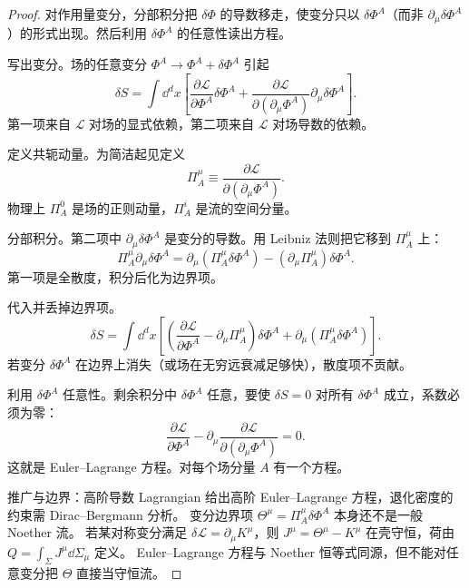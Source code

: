 \begin{proof}
对作用量变分，分部积分把 $\delta\Phi$ 的导数移走，使变分只以 $\delta\Phi^A$（而非 $\partial_\mu\delta\Phi^A$）的形式出现。然后利用 $\delta\Phi^A$ 的任意性读出方程。

写出变分。场的任意变分 $\Phi^A\to\Phi^A+\delta\Phi^A$ 引起
\begin{equation*}
\delta S=\int \dd^dx\left[\frac{\partial\mathcal{L}}{\partial\Phi^A}\delta\Phi^A+\frac{\partial\mathcal{L}}{\partial(\partial_\mu\Phi^A)}\partial_\mu\delta\Phi^A\right].
\end{equation*}
第一项来自 $\mathcal{L}$ 对场的显式依赖，第二项来自 $\mathcal{L}$ 对场导数的依赖。

定义共轭动量。为简洁起见定义
\begin{equation*}
\Pi_A^\mu\equiv\frac{\partial\mathcal{L}}{\partial(\partial_\mu\Phi^A)}.
\end{equation*}
物理上 $\Pi_A^0$ 是场的正则动量，$\Pi_A^i$ 是流的空间分量。

分部积分。第二项中 $\partial_\mu\delta\Phi^A$ 是变分的导数。用 Leibniz 法则把它移到 $\Pi_A^\mu$ 上：
\begin{equation*}
\Pi_A^\mu\partial_\mu\delta\Phi^A=\partial_\mu(\Pi_A^\mu\delta\Phi^A)-(\partial_\mu\Pi_A^\mu)\delta\Phi^A.
\end{equation*}
第一项是全散度，积分后化为边界项。

代入并丢掉边界项。
\begin{equation*}
\delta S=\int \dd^dx\left[\left(\frac{\partial\mathcal{L}}{\partial\Phi^A}-\partial_\mu\Pi_A^\mu\right)\delta\Phi^A+\partial_\mu(\Pi_A^\mu\delta\Phi^A)\right].
\end{equation*}
若变分 $\delta\Phi^A$ 在边界上消失（或场在无穷远衰减足够快），散度项不贡献。

利用 $\delta\Phi^A$ 任意性。剩余积分中 $\delta\Phi^A$ 任意，要使 $\delta S=0$ 对所有 $\delta\Phi^A$ 成立，系数必须为零：
\begin{equation}\label{eq:ms-poincare-EL}
\boxed{
\frac{\partial\mathcal{L}}{\partial\Phi^A}-\partial_\mu\frac{\partial\mathcal{L}}{\partial(\partial_\mu\Phi^A)}=0.
}
\end{equation}
这就是 Euler--Lagrange 方程。对每个场分量 $A$ 有一个方程。

推广与边界：高阶导数 Lagrangian 给出高阶 Euler--Lagrange 方程，退化密度的约束需 Dirac--Bergmann 分析。
变分边界项 $\Theta^\mu=\Pi_A^\mu\delta\Phi^A$ 本身还不是一般 Noether 流。
若某对称变分满足 $\delta\mathcal L=\partial_\mu K^\mu$，则
$J^\mu=\Theta^\mu-K^\mu$ 在壳守恒，荷由 $Q=\int_\Sigma J^\mu\dd\Sigma_\mu$ 定义。
Euler--Lagrange 方程与 Noether 恒等式同源，但不能对任意变分把 $\Theta$ 直接当守恒流。
\end{proof}

